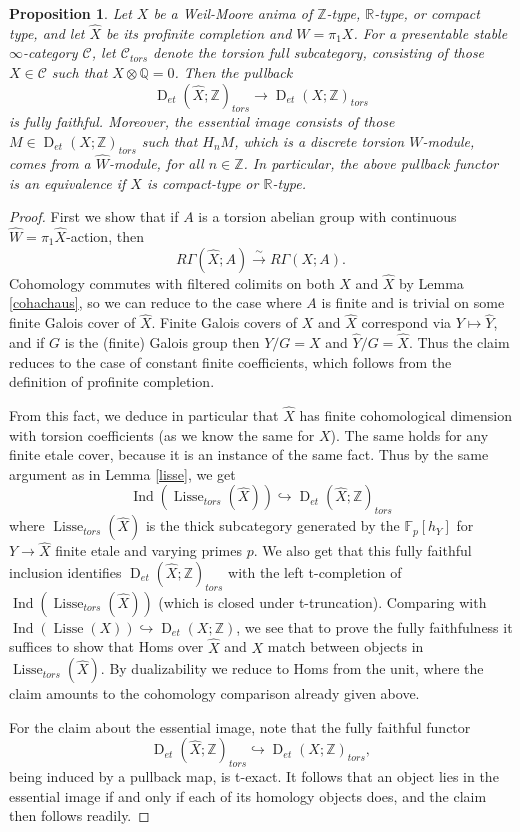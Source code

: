 \documentclass[12pt]{article}
\newtheorem{proposition}[theorem]{Proposition}
\theoremstyle{definition}
\newcommand{\on}{\operatorname}
\newcommand{\mc}{\mathcal}
\newcommand{\mbb}{\mathbb}
\newcommand{\wh}{\widehat}
\begin{document}
\begin{proposition}
Let $X$ be a Weil-Moore anima of $\mbb{Z}$-type, $\mbb{R}$-type, or compact type, and let $\wh{X}$ be its profinite completion and $W=\pi_1X$.  For a presentable stable $\infty$-category $\mc{C}$, let $\mc{C}_{tors}$ denote the torsion full subcategory, consisting of those $X\in\mc{C}$ such that $X\otimes\mbb{Q}=0$.  Then the pullback
$$\on{D}_{et}(\wh{X};\mbb{Z})_{tors} \to \on{D}_{et}(X;\mbb{Z})_{tors}$$
is fully faithful.  Moreover, the essential image consists of those $M\in\on{D}_{et}(X;\mbb{Z})_{tors}$ such that $H_nM$, which is a discrete torsion $W$-module, comes from a $\wh{W}$-module, for all $n\in\mbb{Z}$.  In particular, the above pullback functor is an equivalence if $X$ is compact-type or $\mbb{R}$-type.
\end{proposition}
\begin{proof}
First we show that if $A$ is a torsion abelian group with continuous $\wh{W}=\pi_1\wh{X}$-action, then
$$R\Gamma(\wh{X};A)\overset{\sim}{\rightarrow} R\Gamma(X;A).$$
Cohomology commutes with filtered colimits on both $X$ and $\wh{X}$ by Lemma \ref{cohachaus}, so we can reduce to the case where $A$ is finite and is trivial on some finite Galois cover of $\wh{X}$.  Finite Galois covers of $X$ and $\wh{X}$ correspond via $Y\mapsto \wh{Y}$, and if $G$ is the (finite) Galois group then $Y/G=X$ and $\wh{Y}/G=\wh{X}$.  Thus the claim reduces to the case of constant finite coefficients, which follows from the definition of profinite completion.

From this fact, we deduce in particular that $\wh{X}$ has finite cohomological dimension with torsion coefficients (as we know the same for $X$).  The same holds for any finite etale cover, because it is an instance of the same fact.  Thus by the same argument as in Lemma \ref{lisse}, we get
$$\on{Ind}(\on{Lisse}_{tors}(\wh{X}))\hookrightarrow \on{D}_{et}(\wh{X};\mbb{Z})_{tors}$$
where $\on{Lisse}_{tors}(\wh{X})$ is the thick subcategory generated by the $\mbb{F}_p[h_Y]$ for $Y\to\wh{X}$ finite etale and varying primes $p$.  We also get that this fully faithful inclusion identifies $\on{D}_{et}(\wh{X};
\mbb{Z})_{tors}$ with the left t-completion of $\on{Ind}(\on{Lisse}_{tors}(\wh{X}))$ (which is closed under t-truncation).  Comparing with $\on{Ind}(\on{Lisse}(X))\hookrightarrow\on{D}_{et}(X;\mbb{Z})$, we see that to prove the fully faithfulness it suffices to show that Homs over $\wh{X}$ and $X$ match between objects in $\on{Lisse}_{tors}(\wh{X})$.  By dualizability we reduce to Homs from the unit, where the claim amounts to the cohomology comparison already given above.

For the claim about the essential image, note that the fully faithful functor
$$\on{D}_{et}(\wh{X};\mbb{Z})_{tors}\hookrightarrow\on{D}_{et}(X;\mbb{Z})_{tors},$$
being induced by a pullback map, is t-exact.  It follows that an object lies in the essential image if and only if each of its homology objects does, and the claim then follows readily.
\end{proof}
\end{document}
